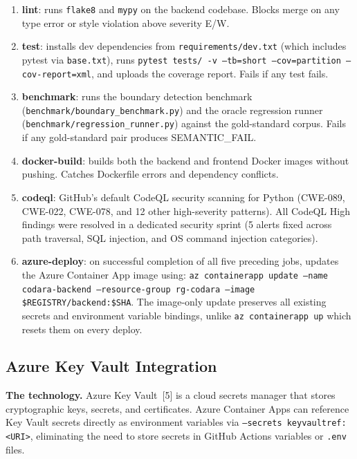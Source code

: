 \begin{enumerate}
  \item \textbf{lint}: runs \texttt{flake8} and \texttt{mypy} on the backend
    codebase. Blocks merge on any type error or style violation above severity
    E/W.
  \item \textbf{test}: installs dev dependencies from
    \texttt{requirements/dev.txt} (which includes pytest via \texttt{base.txt}),
    runs \texttt{pytest tests/ -v --tb=short --cov=partition --cov-report=xml},
    and uploads the coverage report. Fails if any test fails.
  \item \textbf{benchmark}: runs the boundary detection benchmark
    (\texttt{benchmark/boundary\_benchmark.py}) and the oracle regression runner
    (\texttt{benchmark/regression\_runner.py}) against the gold-standard corpus.
    Fails if any gold-standard pair produces SEMANTIC\_FAIL.
  \item \textbf{docker-build}: builds both the backend and frontend Docker
    images without pushing. Catches Dockerfile errors and dependency conflicts.
  \item \textbf{codeql}: GitHub's default CodeQL security scanning for Python
    (CWE-089, CWE-022, CWE-078, and 12 other high-severity patterns). All
    CodeQL High findings were resolved in a dedicated security sprint (5
    alerts fixed across path traversal, SQL injection, and OS command injection
    categories).
  \item \textbf{azure-deploy}: on successful completion of all five preceding
    jobs, updates the Azure Container App image using:
    \texttt{az containerapp update --name codara-backend --resource-group rg-codara
    --image \$REGISTRY/backend:\$SHA}. The image-only update preserves all
    existing secrets and environment variable bindings, unlike
    \texttt{az containerapp up} which resets them on every deploy.
\end{enumerate}

\subsection{Azure Key Vault Integration}
\label{subsec:keyvault}

\textbf{The technology.} Azure Key Vault~[5] is a cloud secrets manager that
stores cryptographic keys, secrets, and certificates. Azure Container Apps can
reference Key Vault secrets directly as environment variables via
\texttt{--secrets keyvaultref:<URI>}, eliminating the need to store secrets
in GitHub Actions variables or \texttt{.env} files.

